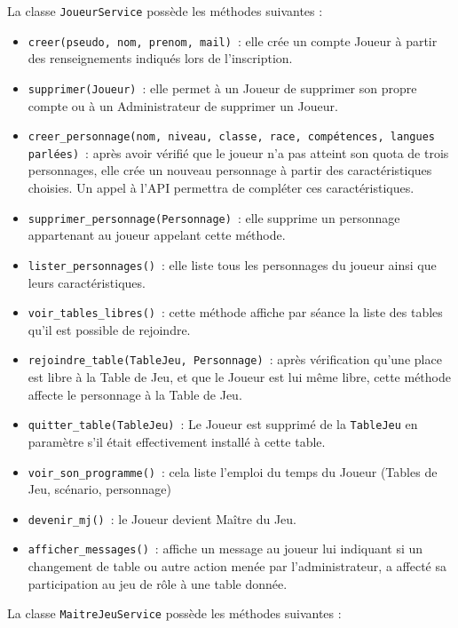 \documentclass[11pt]{article}
\begin{document}
La classe \texttt{JoueurService} possède les méthodes suivantes :
\begin{itemize}[label=, font=\small]
    \item \texttt{creer(pseudo, nom, prenom, mail)}~: elle crée un compte Joueur à partir des renseignements indiqués lors de l'inscription.
    \item \texttt{supprimer(Joueur)}~: elle permet à un Joueur de supprimer son propre compte ou à un Administrateur de supprimer un Joueur.
    \item \texttt{creer\_personnage(nom, niveau, classe, race, compétences, langues parlées)}~: après avoir vérifié que le joueur n'a pas atteint son quota de trois personnages, elle crée un nouveau personnage à partir des caractéristiques choisies. Un appel à l'API permettra de compléter ces caractéristiques.
    \item \texttt{supprimer\_personnage(Personnage)}~: elle supprime un personnage appartenant au joueur appelant cette méthode.
    \item \texttt{lister\_personnages()}~: elle liste tous les personnages du joueur ainsi que leurs caractéristiques.
    \item \texttt{voir\_tables\_libres()}~: cette méthode affiche par séance la liste des tables qu'il est possible de rejoindre.
    \item \texttt{rejoindre\_table(TableJeu, Personnage)}~: après vérification qu'une place est libre à la Table de Jeu, et que le Joueur est lui même libre, cette méthode affecte le personnage à la Table de Jeu.
    \item \texttt{quitter\_table(TableJeu)}~: Le Joueur est supprimé de la \texttt{TableJeu} en paramètre s'il était effectivement installé à cette table.
    \item \texttt{voir\_son\_programme()}~: cela liste l'emploi du temps du Joueur (Tables de Jeu, scénario, personnage)
    \item \texttt{devenir\_mj()}~: le Joueur devient Maître du Jeu.
    \item \texttt{afficher\_messages()}~: affiche un message au joueur lui indiquant si un changement de table ou autre action menée par l'administrateur, a affecté sa participation au jeu de rôle à une table donnée.
\end{itemize}


\bigbreak


La classe \texttt{MaitreJeuService} possède les méthodes suivantes :
\end{document}
